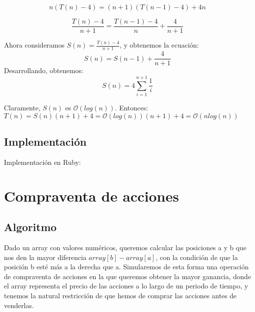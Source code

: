 \documentclass[a4paper, 11pt]{article} %
\begin{document}
	  \begin{equation}
	    n(T(n)-4) = (n+1)(T(n-1)-4) + 4n
	  \end{equation}
	  
	  \begin{equation}
	  	\frac{T(n)-4}{n+1} = \frac{T(n-1)-4}{n} + \frac{4}{n+1}
	  \end{equation}
	  
      Ahora consideramos $S(n) = \frac{T(n)-4}{n+1}$, y obtenemos la ecuación:
      \begin{equation}
        S(n) = S(n-1) + \frac{4}{n+1}
      \end{equation}
      Desarrollando, obtenemos:
      \begin{equation}
        S(n) = 4 \sum^{n+1}_{i=1} \frac{1}{i}
      \end{equation}
      
      Claramente, $S(n)$ es $\mathcal{O}(log(n))$. Entonces: \\
      $T(n) = S(n)(n+1) + 4 = \mathcal{O}(log(n)) (n+1) + 4 = \mathcal{O}(nlog(n))$

      \subsection{Implementación}
      Implementación en Ruby:

      \small
      \texttt{}
      \normalsize
      
      
\section {Compraventa de acciones}
\subsection{Algoritmo}
	Dado un array con valores numéricos, queremos calcular las posiciones a y b que nos den la mayor diferencia $array[b]-array[a]$, con la condición de que la posición b esté más a la derecha que a.
	Simularemos de esta forma una operación de compraventa de acciones en la que queremos obtener la mayor ganancia, donde el array representa el precio de las acciones a lo largo de un periodo de tiempo, y tenemos la natural restricción de que hemos de comprar las acciones antes de venderlas. 
	
\end{document}
